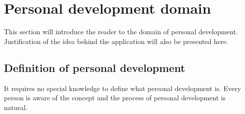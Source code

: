 
\chapter{Personal development domain}\label{ch:personal-development-domain}


This section will introduce the reader to the domain of personal development.
Justification of the idea behind the application will also be presented here.

\section{Definition of personal development}\label{sec:definition-of-personal-development}

It requires no special knowledge to define what personal development is.
Every person is aware of the concept and the process of personal development is natural.